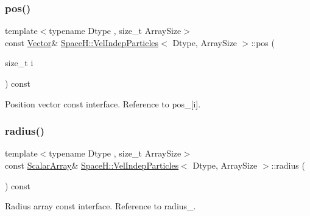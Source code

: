 \subsubsection{\texorpdfstring{pos()}{pos()}\hspace{0.1cm}{\footnotesize\ttfamily [2/2]}}
{\footnotesize\ttfamily template$<$typename Dtype , size\+\_\+t Array\+Size$>$ \\
const \mbox{\hyperlink{class_space_h_1_1_vel_indep_particles_a61bbcfdb0dc7f99f3c68af69a755c935}{Vector}}\& \mbox{\hyperlink{class_space_h_1_1_vel_indep_particles}{Space\+H\+::\+Vel\+Indep\+Particles}}$<$ Dtype, Array\+Size $>$\+::pos (\begin{DoxyParamCaption}\item[{size\+\_\+t}]{i }\end{DoxyParamCaption}) const\hspace{0.3cm}{\ttfamily [inline]}}



Position vector const interface. Reference to pos\+\_\+\mbox{[}i\mbox{]}. 

\mbox{\label{class_space_h_1_1_vel_indep_particles_afa31f804fe6386f0036f59ae25b2175e}} 
\subsubsection{\texorpdfstring{radius()}{radius()}\hspace{0.1cm}{\footnotesize\ttfamily [1/2]}}
{\footnotesize\ttfamily template$<$typename Dtype , size\+\_\+t Array\+Size$>$ \\
const \mbox{\hyperlink{class_space_h_1_1_vel_indep_particles_ab5efeef52fb5748c25fbfeb04b64640e}{Scalar\+Array}}\& \mbox{\hyperlink{class_space_h_1_1_vel_indep_particles}{Space\+H\+::\+Vel\+Indep\+Particles}}$<$ Dtype, Array\+Size $>$\+::radius (\begin{DoxyParamCaption}{ }\end{DoxyParamCaption}) const\hspace{0.3cm}{\ttfamily [inline]}}



Radius array const interface. Reference to radius\+\_\+. 

